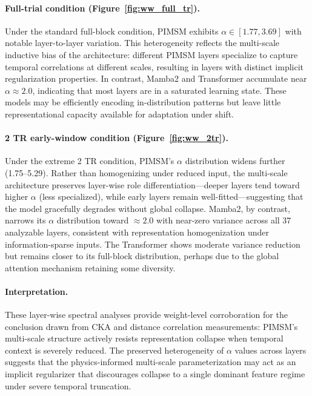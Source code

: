 \documentclass{article}
\begin{document}
\paragraph{Full-trial condition (Figure~\ref{fig:ww_full_tr}).}
Under the standard full-block condition, PIMSM exhibits $\alpha \in [1.77, 3.69]$ with notable layer-to-layer variation.
This heterogeneity reflects the multi-scale inductive bias of the architecture: different PIMSM layers specialize to capture temporal correlations at different scales, resulting in layers with distinct implicit regularization properties.
In contrast, Mamba2 and Transformer accumulate near $\alpha \approx 2.0$, indicating that most layers are in a saturated learning state.
These models may be efficiently encoding in-distribution patterns but leave little representational capacity available for adaptation under shift.

\paragraph{2 TR early-window condition (Figure~\ref{fig:ww_2tr}).}
Under the extreme 2 TR condition, PIMSM's $\alpha$ distribution widens further (1.75--5.29).
Rather than homogenizing under reduced input, the multi-scale architecture preserves layer-wise role differentiation---deeper layers tend toward higher $\alpha$ (less specialized), while early layers remain well-fitted---suggesting that the model gracefully degrades without global collapse.
Mamba2, by contrast, narrows its $\alpha$ distribution toward $\approx 2.0$ with near-zero variance across all 37 analyzable layers, consistent with representation homogenization under information-sparse inputs.
The Transformer shows moderate variance reduction but remains closer to its full-block distribution, perhaps due to the global attention mechanism retaining some diversity.

\paragraph{Interpretation.}
These layer-wise spectral analyses provide weight-level corroboration for the conclusion drawn from CKA and distance correlation measurements:
PIMSM's multi-scale structure actively resists representation collapse when temporal context is severely reduced.
The preserved heterogeneity of $\alpha$ values across layers suggests that the physics-informed multi-scale parameterization may act as an implicit regularizer that discourages collapse to a single dominant feature regime under severe temporal truncation.
\end{document}
